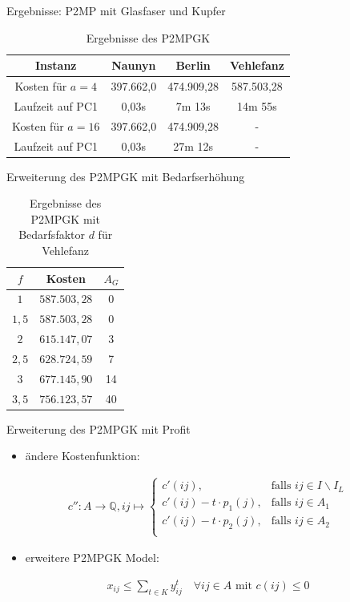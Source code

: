 \documentclass{beamer}
\newcommand{\Q}{\mathbb{Q}}
\begin{document}
\begin{frame}{Ergebnisse: P2MP mit Glasfaser und Kupfer}
	 \begin{table}[h]
	 	\centering
	 	\begin{tabular}{c|c|c|c}
	 		Instanz & Naunyn & Berlin & Vehlefanz \\	
	 		\hline
	 		Kosten für $a=4$ & 397.662,0 & 474.909,28 & 587.503,28 \\
	 		Laufzeit auf PC1 & 0,03s & 7m 13s & 14m 55s \\
	 		\hline
	 		Kosten für $a=16$ & 397.662,0 & 474.909,28 & -\\
	 		Laufzeit auf PC1 & 0,03s & 27m 12s & - \\
	 	\end{tabular}
	 	\caption{Ergebnisse des P2MPGK}
	 	\label{P2MPGK}
	 \end{table}
\end{frame}

\begin{frame}{Erweiterung des P2MPGK mit Bedarfserhöhung}
\begin{table}[!htbp]
	\centering
	\begin{tabular}{c|c|c}
		\centering
		$f$ & Kosten & $A_G$ \\	
		\hline
		$1$   	 &  \(587.503,28\) & 0  \\
		$1,5$ 	&   $587.503,28$  & 0  \\
		$2$   	&   $615.147,07$ & 3 \\
		$2,5$   	&   $628.724,59$ & 7 \\
		$3$    &   $677.145,90$ & 14 \\
		$3,5$   	&   $756.123,57$ & 40 \\
	\end{tabular}
	\caption{Ergebnisse des P2MPGK mit Bedarfsfaktor $d$ f\"ur Vehlefanz} 
	\label{P2MPGKBedarfV}
\end{table}
\end{frame}

		\begin{frame}{Erweiterung des P2MPGK mit Profit}
			\begin{itemize}
				\item ändere Kostenfunktion:
			\end{itemize}
		\begin{align*}
			c'': A  \rightarrow \Q,  ij  \mapsto \left\{\begin{array}{cl} 
			c'(ij), & \text{falls } ij \in I\backslash I_L \\ 
			c'(ij) -t  \cdot p_1(j), & \text{falls } ij \in A_1 \\ 
			c'(ij) -t \cdot p_2(j), & \text{falls } ij \in  A_2 \\ 
		\end{array}  \right.
		\end{align*}
			\begin{itemize}
				\item erweitere P2MPGK Model:
			\end{itemize}
			\begin{align*}
			x_{ij} \leq \displaystyle\sum_{t \in K} y_{ij}^t \quad \forall ij \in A \text{ mit } c(ij) \leq 0
			\end{align*}
		\end{frame}
\end{document}
